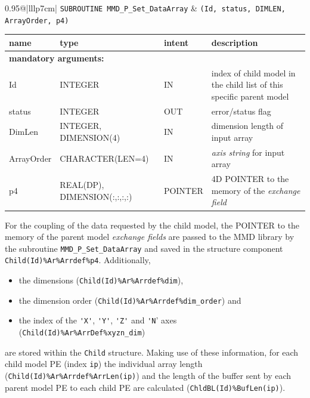 \documentclass[twoside]{article}
\begin{document}
\begin{itemize}
\begin{tabular*}{0.95\textwidth}{@{\extracolsep\fill}|lllp{7cm}|}
\hline
{}
{\tt SUBROUTINE MMD\_P\_Set\_DataArray} &
{\tt (Id, status, DIMLEN, ArrayOrder, p4)}\\
\hline
\end{tabular*}
\begin{tabular*}{0.95\textwidth}{@{\extracolsep\fill}|lllp{7cm}|}
name & type & intent & description\\
\hline
\multicolumn{4}{|l|}{\bf mandatory arguments:}\\
Id & {\footnotesize INTEGER} & IN &  index of child model in the child list of this specific parent model\\
status &{\footnotesize INTEGER} & OUT & error/status flag \\
DimLen & {\footnotesize INTEGER, DIMENSION(4)} & IN & dimension length of input array \\
ArrayOrder & {\footnotesize CHARACTER(LEN=4)} & IN & {\it axis string} for input array \\
p4 & {\footnotesize  REAL(DP), DIMENSION(:,:,:,:)} & {\footnotesize POINTER} & 4D {\footnotesize {\footnotesize POINTER}} to the 
memory of the {\it exchange field}\\
\hline
\end{tabular*}
\smallskip

For the coupling of the data requested by the child model, the
 {\footnotesize POINTER} to the memory of the parent model 
 {\it exchange fields} are passed to the 
MMD library by the subroutine \verb|MMD_P_Set_DataArray| and saved in the
structure component \verb|Child(Id)%Ar%Arrdef%p4|.
Additionally,
\begin{itemize}
\item the dimensions (\verb|Child(Id)%Ar%Arrdef%dim|), 
\item the dimension order (\verb|Child(Id)%Ar%Arrdef%dim_order|) and 
\item the index of the \verb|'X'|, \verb|'Y'|, \verb|'Z'| and \verb|'N|' axes 
(\verb|Child(Id)%Ar%ArrDef%xyzn_dim|)
\end{itemize}
 are stored within the \verb|Child| structure. Making use of these information,
for each child model PE (index \verb|ip|) the individual array length 
(\verb|Child(Id)%Ar%Arrdef%ArrLen(ip)|) and the length of the buffer
sent by each parent model PE to each child PE are calculated
 (\verb|ChldBL(Id)%BufLen(ip)|).  



\end{itemize}
\end{document}
